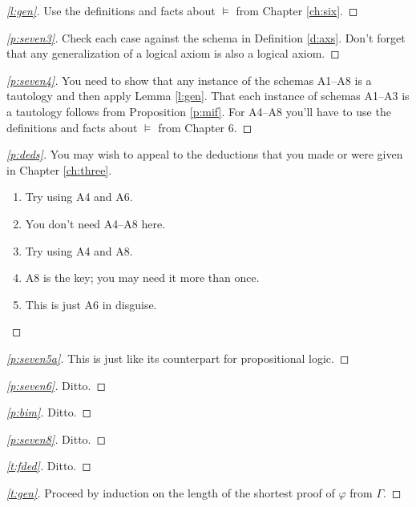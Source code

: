 \documentclass[12pt]{amsbook}
\theoremstyle{plain}
\theoremstyle{definition}
\theoremstyle{remark}
\newenvironment{clue}[1]%
{\begin{proof}[\ref{#1}]}%
{\renewcommand{\qed}{}\end{proof}}
\begin{document}
\begin{clue}{l:gen}
Use the definitions and facts about $\models$ from Chapter \ref{ch:six}.
\end{clue}

\begin{clue}{p:seven3}
Check each case against the schema in Definition \ref{d:axs}.  Don't forget that any generalization of a logical axiom is also a logical axiom.
\end{clue}

\begin{clue}{p:seven4}
You need to show that any instance of the schemas A1--A8 is a tautology and then apply Lemma \ref{l:gen}.  That each instance of schemas A1--A3 is a tautology follows from Proposition \ref{p:mif}.  For A4--A8 you'll have to use the definitions and facts about $\models$ from Chapter 6.
\end{clue}

\begin{clue}{p:deds}
You may wish to appeal to the deductions that you made or were given in Chapter \ref{ch:three}.
\begin{enumerate}
\item Try using A4 and A6.
\item You don't need A4--A8 here.
\item Try using A4 and A8.
\item A8 is the key;  you may need it more than once.
\item This is just A6 in disguise.
\end{enumerate}
\end{clue}

\begin{clue}{p:seven5a}
This is just like its counterpart for propositional logic.
\end{clue}

\begin{clue}{p:seven6}
Ditto.
\end{clue}

\begin{clue}{p:bim}
Ditto.
\end{clue}

\begin{clue}{p:seven8}
Ditto.
\end{clue}

\begin{clue}{t:fded}
Ditto.
\end{clue}

\begin{clue}{t:gen}
Proceed by induction on the length of the shortest proof of $\varphi$ from $\Gamma$.
\end{clue}
\end{document}
